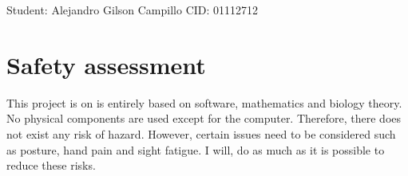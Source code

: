 \documentclass{article}
\begin{document}
Student: Alejandro Gilson Campillo    CID: 01112712

\section{Safety assessment}

This project is on is entirely based on software, mathematics and biology theory. No physical components are used except for the computer. Therefore, there does not exist any risk of hazard. However, certain issues need to be considered such as posture, hand pain and sight fatigue. I will, do as much as it is possible to reduce these risks. 
\end{document}
